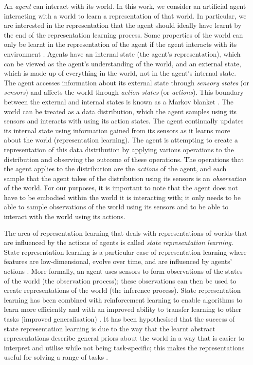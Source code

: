 An \textit{agent} can interact with its world.
In this work, we consider an artificial agent interacting with a world to learn a representation of that world.
In particular, we are interested in the representation that the agent should ideally have learnt by the end of the representation learning process.
Some properties of the world can only be learnt in the representation of the agent if the agent interacts with its environment \autocite{caselles2019symmetry,thomas2018disentangling}.
Agents have an internal state (the agent's representation), which can be viewed as the agent's understanding of the world, and an external state, which is made up of everything in the world, not in the agent's internal state.
The agent accesses information about its external state through \textit{sensory states} (or \textit{sensors}) and affects the world through \textit{action states} (or \textit{actions}).
This boundary between the external and internal states is known as a Markov blanket \autocite{Palacios2020, Kirchhoff2018}.
The world can be treated as a data distribution, which the agent samples using its sensors and interacts with using its action states.
The agent continually updates its internal state using information gained from its sensors as it learns more about the world (representation learning).
The agent is attempting to create a representation of this data distribution by applying various operations to the distribution and observing the outcome of these operations.
The operations that the agent applies to the distribution are the \textit{actions} of the agent, and each sample that the agent takes of the distribution using its sensors is an \textit{observation} of the world.
For our purposes, it is important to note that the agent does not have to be embodied within the world it is interacting with; it only needs to be able to sample observations of the world using its sensors and to be able to interact with the world using its actions.

The area of representation learning that deals with representations of worlds that are influenced by the actions of agents is called \textit{state representation learning}.
State representation learning is a particular case of representation learning where features are low-dimensional, evolve over time, and are influenced by agents' actions \autocite{Lesort2018StateRL}.
More formally, an agent uses sensors to form observations of the states of the world (the observation process); these observations can then be used to create representations of the world (the inference process).
State representation learning has been combined with reinforcement learning to enable algorithms to learn more efficiently and with an improved ability to transfer learning to other tasks (improved generalisation) \autocite{munk2016learning}.
It has been hypothesised that the success of state representation learning is due to the way that the learnt abstract representations describe general priors about the world in a way that is easier to interpret and utilise while not being task-specific; this makes the representations useful for solving a range of tasks \autocite{Bengio2013}.

